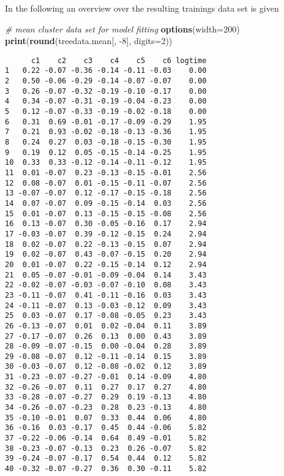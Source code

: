 \documentclass[]{article}
\newenvironment{Shaded}{\begin{snugshade}}{\end{snugshade}}
\newcommand{\KeywordTok}[1]{\textcolor[rgb]{0.13,0.29,0.53}{\textbf{{#1}}}}
\newcommand{\DataTypeTok}[1]{\textcolor[rgb]{0.13,0.29,0.53}{{#1}}}
\newcommand{\DecValTok}[1]{\textcolor[rgb]{0.00,0.00,0.81}{{#1}}}
\newcommand{\CommentTok}[1]{\textcolor[rgb]{0.56,0.35,0.01}{\textit{{#1}}}}
\newcommand{\NormalTok}[1]{{#1}}
\begin{document}
In the following an overview over the resulting trainings data set is
given \small

\begin{Shaded}
\begin{Highlighting}[]
\CommentTok{# mean cluster data set for model fitting}
\KeywordTok{options}\NormalTok{(}\DataTypeTok{width=}\DecValTok{200}\NormalTok{)}
\KeywordTok{print}\NormalTok{(}\KeywordTok{round}\NormalTok{(treedata.mean[, -}\DecValTok{8}\NormalTok{], }\DataTypeTok{digits=}\DecValTok{2}\NormalTok{))}
\end{Highlighting}
\end{Shaded}

\begin{verbatim}
      c1    c2    c3    c4    c5    c6 logtime
1   0.22 -0.07 -0.36 -0.14 -0.11 -0.03    0.00
2   0.50 -0.06 -0.29 -0.14 -0.07 -0.07    0.00
3   0.26 -0.07 -0.32 -0.19 -0.10 -0.17    0.00
4   0.34 -0.07 -0.31 -0.19 -0.04 -0.23    0.00
5   0.12 -0.07 -0.33 -0.19 -0.02 -0.18    0.00
6   0.31  0.69 -0.01 -0.17 -0.09 -0.29    1.95
7   0.21  0.93 -0.02 -0.18 -0.13 -0.36    1.95
8   0.24  0.27  0.03 -0.18 -0.15 -0.30    1.95
9   0.19  0.12  0.05 -0.15 -0.14 -0.25    1.95
10  0.33  0.33 -0.12 -0.14 -0.11 -0.12    1.95
11  0.01 -0.07  0.23 -0.13 -0.15 -0.01    2.56
12  0.08 -0.07  0.01 -0.15 -0.11 -0.07    2.56
13 -0.07 -0.07  0.12 -0.17 -0.15 -0.18    2.56
14  0.07 -0.07  0.09 -0.15 -0.14  0.03    2.56
15  0.01 -0.07  0.13 -0.15 -0.15 -0.08    2.56
16  0.13 -0.07  0.30 -0.05 -0.16  0.17    2.94
17 -0.03 -0.07  0.39 -0.12 -0.15  0.24    2.94
18  0.02 -0.07  0.22 -0.13 -0.15  0.07    2.94
19  0.02 -0.07  0.43 -0.07 -0.15  0.20    2.94
20  0.01 -0.07  0.22 -0.15 -0.14  0.12    2.94
21  0.05 -0.07 -0.01 -0.09 -0.04  0.14    3.43
22 -0.02 -0.07 -0.03 -0.07 -0.10  0.08    3.43
23 -0.11 -0.07  0.41 -0.11 -0.16  0.03    3.43
24 -0.11 -0.07  0.13 -0.03 -0.12  0.09    3.43
25  0.03 -0.07  0.17 -0.08 -0.05  0.23    3.43
26 -0.13 -0.07  0.01  0.02 -0.04  0.11    3.89
27 -0.17 -0.07  0.26  0.13  0.00  0.43    3.89
28 -0.09 -0.07 -0.15  0.00 -0.04  0.28    3.89
29 -0.08 -0.07  0.12 -0.11 -0.14  0.15    3.89
30 -0.03 -0.07  0.12 -0.08 -0.02  0.12    3.89
31 -0.23 -0.07 -0.27 -0.01  0.14 -0.09    4.80
32 -0.26 -0.07  0.11  0.27  0.17  0.27    4.80
33 -0.28 -0.07 -0.27  0.29  0.19 -0.13    4.80
34 -0.26 -0.07 -0.23  0.28  0.23 -0.13    4.80
35 -0.10 -0.01  0.07  0.33  0.44  0.06    4.80
36 -0.16  0.03 -0.17  0.45  0.44 -0.06    5.82
37 -0.22 -0.06 -0.14  0.64  0.49 -0.01    5.82
38 -0.23 -0.07 -0.13  0.23  0.26 -0.07    5.82
39 -0.24 -0.07 -0.17  0.54  0.44  0.12    5.82
40 -0.32 -0.07 -0.27  0.36  0.30 -0.11    5.82
\end{verbatim}
\end{document}
